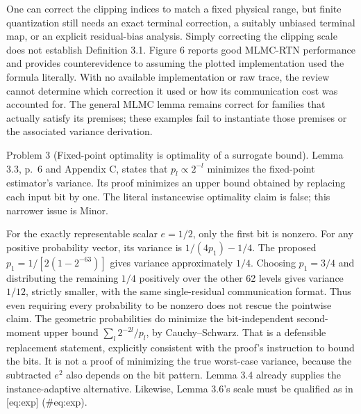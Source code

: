 \documentclass[10pt]{article}
\begin{document}
One can correct the clipping indices to match a fixed physical range, but finite quantization still needs an exact terminal correction, a suitably unbiased terminal map, or an explicit residual-bias analysis. Simply correcting the clipping scale does not establish Definition 3.1. Figure 6 reports good MLMC-RTN performance and provides counterevidence to assuming the plotted implementation used the formula literally. With no available implementation or raw trace, the review cannot determine which correction it used or how its communication cost was accounted for. The general MLMC lemma remains correct for families that actually satisfy its premises; these examples fail to instantiate those premises or the associated variance derivation.\par
Problem 3 (Fixed-point optimality is optimality of a surrogate bound).  Lemma 3.3, p. 6 and Appendix C, states that \(p_l\propto2^{-l}\) minimizes the fixed-point estimator’s variance. Its proof minimizes an upper bound obtained by replacing each input bit by one. The literal instancewise optimality claim is false; this narrower issue is Minor.\par
For the exactly representable scalar \(e=1/2\), only the first bit is nonzero. For any positive probability vector, its variance is \(1/(4p_1)-1/4\). The proposed \(p_1=1/[2(1-2^{-63})]\) gives variance approximately \(1/4\). Choosing \(p_1=3/4\) and distributing the remaining \(1/4\) positively over the other 62 levels gives variance \(1/12\), strictly smaller, with the same single-residual communication format. Thus even requiring every probability to be nonzero does not rescue the pointwise claim. The geometric probabilities do minimize the bit-independent second-moment upper bound \(\sum_l 2^{-2l}/p_l\), by Cauchy–Schwarz. That is a defensible replacement statement, explicitly consistent with the proof’s instruction to bound the bits. It is not a proof of minimizing the true worst-case variance, because the subtracted \(e^2\) also depends on the bit pattern. Lemma 3.4 already supplies the instance-adaptive alternative. Likewise, Lemma 3.6’s scale must be qualified as in [eq:exp] (\#eq:exp).\par
\end{document}
